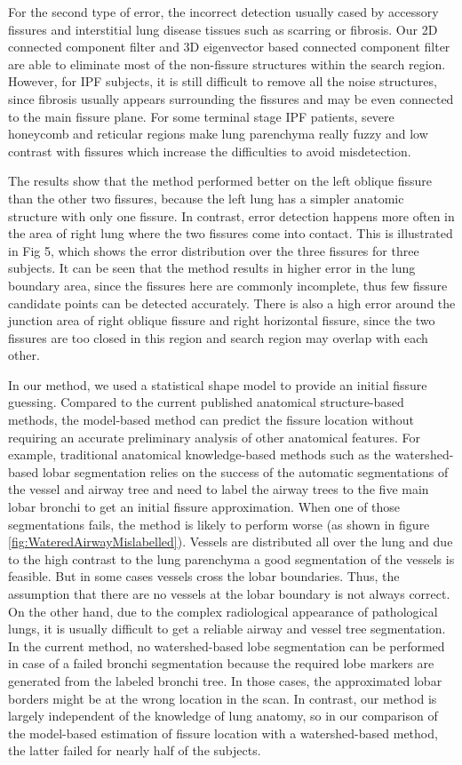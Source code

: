 {For the second type of error, the incorrect detection usually cased by accessory fissures and interstitial lung disease tissues such as scarring or fibrosis. Our 2D connected component filter and 3D eigenvector based connected component filter are able to eliminate most of the non-fissure structures within the search region. However, for IPF subjects, it is still difficult to remove all the noise structures, since fibrosis usually appears surrounding the fissures and may be even connected to the main fissure plane. For some terminal stage IPF patients, severe honeycomb and reticular regions make lung parenchyma really fuzzy and low contrast with fissures which increase the difficulties to avoid misdetection.

The results show that the method performed better on the left oblique fissure than the other two fissures, because the left lung has a simpler anatomic structure with only one fissure. In contrast, error detection happens more often in the area of right lung where the two fissures come into contact. This is illustrated in Fig 5, which shows the error distribution over the three fissures for three subjects. It can be seen that the method results in higher error in the lung boundary area, since the fissures here are commonly incomplete, thus few fissure candidate points can be detected accurately. There is also a high error around the junction area of right oblique fissure and right horizontal fissure, since the two fissures are too closed in this region and search region may overlap with each other.

In our method, we used a statistical shape model to provide an initial fissure guessing. Compared to the current published anatomical structure-based methods, the model-based method can predict the fissure location without requiring an accurate preliminary analysis of other anatomical features. For example, traditional anatomical knowledge-based methods such as the watershed-based lobar segmentation relies on the success of the automatic segmentations of the vessel and airway tree and need to label the airway trees to the five main lobar bronchi to get an initial fissure approximation. When one of those segmentations fails, the method is likely to perform worse (as shown in figure \ref{fig:WateredAirwayMislabelled}). Vessels are distributed all over the lung and due to the high contrast to the lung parenchyma a good segmentation of the vessels is feasible.  But in some cases vessels cross the lobar boundaries. Thus, the assumption that there are no vessels at the lobar boundary is not always correct. On the other hand, due to the complex radiological appearance of pathological lungs, it is usually difficult to get a reliable airway and vessel tree segmentation. In the current method, no watershed-based lobe segmentation can be performed in case of a failed bronchi segmentation because the required lobe markers are generated from the labeled bronchi tree. In those cases, the approximated lobar borders might be at the wrong location in the scan. In contrast, our method is largely independent of the knowledge of lung anatomy, so in our comparison of the model-based estimation of fissure location with a watershed-based method, the latter failed for nearly half of the subjects. 

}
